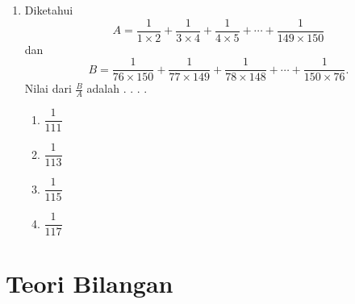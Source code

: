 \documentclass{article}
\begin{document}
\begin{enumerate}[label={Soal \arabic*}]
    \item Diketahui
    $$ A =\frac{1}{1\times 2} + \frac{1}{3\times 4}+\frac{1}{4\times 5}+\cdots + \frac{1}{149\times 150} $$
    dan 
    $$ B =\frac{1}{76\times 150} + \frac{1}{77\times 149} + \frac{1}{78\times 148}+\cdots + \frac{1}{150\times 76}. $$
    Nilai dari $\frac{B}{A}$ adalah . . . .
    \begin{enumerate}[label={(\Alph*)}]
        \item $\dfrac{1}{111}$ \item $\dfrac{1}{113}$ \item $\dfrac{1}{115}$ \item $\dfrac{1}{117}$
    \end{enumerate}
\end{enumerate}

\section*{Teori Bilangan}
\end{document}
